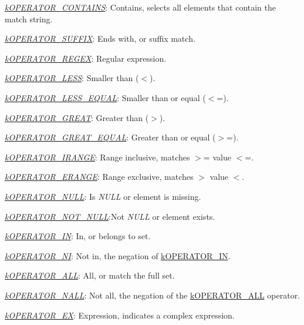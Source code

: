 {\begin{DoxyItemize}
\begin{DoxyItemize}
\begin{DoxyItemize}
\begin{DoxyItemize}
\item {\itshape \hyperlink{}{k\-O\-P\-E\-R\-A\-T\-O\-R\-\_\-\-C\-O\-N\-T\-A\-I\-N\-S}}\-: Contains, selects all elements that contain the match string. 
\item {\itshape \hyperlink{}{k\-O\-P\-E\-R\-A\-T\-O\-R\-\_\-\-S\-U\-F\-F\-I\-X}}\-: Ends with, or suffix match. 
\item {\itshape \hyperlink{}{k\-O\-P\-E\-R\-A\-T\-O\-R\-\_\-\-R\-E\-G\-E\-X}}\-: Regular expression. 
\item {\itshape \hyperlink{}{k\-O\-P\-E\-R\-A\-T\-O\-R\-\_\-\-L\-E\-S\-S}}\-: Smaller than ($<$). 
\item {\itshape \hyperlink{}{k\-O\-P\-E\-R\-A\-T\-O\-R\-\_\-\-L\-E\-S\-S\-\_\-\-E\-Q\-U\-A\-L}}\-: Smaller than or equal ($<$=). 
\item {\itshape \hyperlink{}{k\-O\-P\-E\-R\-A\-T\-O\-R\-\_\-\-G\-R\-E\-A\-T}}\-: Greater than ($>$). 
\item {\itshape \hyperlink{}{k\-O\-P\-E\-R\-A\-T\-O\-R\-\_\-\-G\-R\-E\-A\-T\-\_\-\-E\-Q\-U\-A\-L}}\-: Greater than or equal ($>$=). 
\item {\itshape \hyperlink{}{k\-O\-P\-E\-R\-A\-T\-O\-R\-\_\-\-I\-R\-A\-N\-G\-E}}\-: Range inclusive, matches $>$= value $<$=. 
\item {\itshape \hyperlink{}{k\-O\-P\-E\-R\-A\-T\-O\-R\-\_\-\-E\-R\-A\-N\-G\-E}}\-: Range exclusive, matches $>$ value $<$. 
\item {\itshape \hyperlink{}{k\-O\-P\-E\-R\-A\-T\-O\-R\-\_\-\-N\-U\-L\-L}}\-: Is {\itshape N\-U\-L\-L} or element is missing. 
\item {\itshape \hyperlink{}{k\-O\-P\-E\-R\-A\-T\-O\-R\-\_\-\-N\-O\-T\-\_\-\-N\-U\-L\-L}}\-:Not {\itshape N\-U\-L\-L} or element exists. 
\item {\itshape \hyperlink{}{k\-O\-P\-E\-R\-A\-T\-O\-R\-\_\-\-I\-N}}\-: In, or belongs to set. 
\item {\itshape \hyperlink{}{k\-O\-P\-E\-R\-A\-T\-O\-R\-\_\-\-N\-I}}\-: Not in, the negation of \hyperlink{}{k\-O\-P\-E\-R\-A\-T\-O\-R\-\_\-\-I\-N}. 
\item {\itshape \hyperlink{}{k\-O\-P\-E\-R\-A\-T\-O\-R\-\_\-\-A\-L\-L}}\-: All, or match the full set. 
\item {\itshape \hyperlink{}{k\-O\-P\-E\-R\-A\-T\-O\-R\-\_\-\-N\-A\-L\-L}}\-: Not all, the negation of the \hyperlink{}{k\-O\-P\-E\-R\-A\-T\-O\-R\-\_\-\-A\-L\-L} operator. 
\item {\itshape \hyperlink{}{k\-O\-P\-E\-R\-A\-T\-O\-R\-\_\-\-E\-X}}\-: Expression, indicates a complex expression. 

\end{DoxyItemize}
\end{DoxyItemize}
\end{DoxyItemize}
\end{DoxyItemize}}
